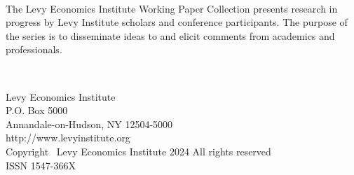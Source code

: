 \documentclass[
  12pt,
]{article}
\begin{document}
\begin{titlepage}
\center{\textcolor{lightgray}{\rule{0.8\textwidth}{0.5mm}}}\\[0.5cm]
        \vfill
    \begin{minipage}[b][0.20\textheight][b]{\textwidth}
    
        
        \begin{minipage}{\textwidth}
            \small
            The Levy Economics Institute Working Paper Collection presents research in progress by Levy Institute scholars and conference participants. The purpose of the series is to disseminate ideas to and elicit comments from academics and professionals.
        \end{minipage}\\[0.5cm]

        \begin{center}
        \end{center} 
        \centering
        \vspace{0.5cm}
        \footnotesize   
        Levy Economics Institute\\
        P.O. Box 5000\\
        Annandale-on-Hudson, NY 12504-5000\\
        http://www.levyinstitute.org\\
        Copyright \textcopyright\ Levy Economics Institute 2024 All rights reserved\\
        ISSN 1547-366X

    \end{minipage}
  
\thispagestyle{empty}
\clearpage{}

\end{titlepage}

\restoregeometry

\newpage

\newpage{}
\end{document}
